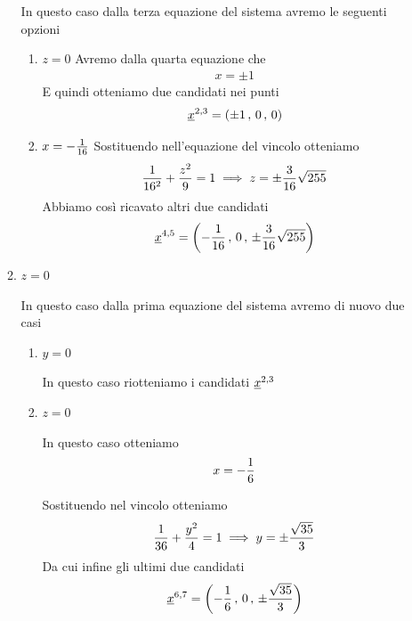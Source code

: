 \begin{enumerate}
\begin{enumerate}
		In questo caso dalla terza equazione del sistema avremo le seguenti opzioni
		\begin{enumerate}
			\item $z=0$
			Avremo dalla quarta equazione che
			\begin{align}
				x=\pm 1
			\end{align}
			E quindi otteniamo due candidati nei punti
			\begin{align}
				\underline{x}^{2,3}=(\pm 1 \, , \, 0 \, , \, 0)
			\end{align}
			\item $x= -\frac{1}{16}$
			Sostituendo nell'equazione del vincolo otteniamo
			\begin{align}
				\frac{1}{16^2} + \frac{z^2}{9}=1 \implies z = \pm \frac{3}{16}\sqrt{255}
			\end{align}
			Abbiamo così ricavato altri due candidati
			\begin{align}
				\underline{x}^{4,5}= \left( -\frac{1}{16} \, , \, 0 \, , \,  \pm \frac{3}{16}\sqrt{255}  \right)
			\end{align}
		\end{enumerate}
		\newpage
		
		\item $z=0$
		
		In questo caso dalla prima equazione del sistema avremo di nuovo due casi
		\begin{enumerate}
			\item $y=0$
			
			In questo caso riotteniamo i candidati $\underline{x}^{2,3}$
			
			\item $z=0$
			
			In questo caso otteniamo
			\begin{align}
				x=-\frac{1}{6}
			\end{align}
			
			Sostituendo nel vincolo otteniamo
			\begin{align}
				\frac{1}{36} + \frac{y^2}{4}=1 \implies y= \pm \frac{\sqrt{35}}{3}
			\end{align}
			Da cui infine gli ultimi due candidati
			\begin{align}
				\underline{x}^{6,7}= \left( -\frac{1}{6} \, , \, 0 \, , \,  \pm \frac{\sqrt{35}}{3} \right)
			\end{align}
		\end{enumerate} 
	\end{enumerate}
\end{enumerate}	


